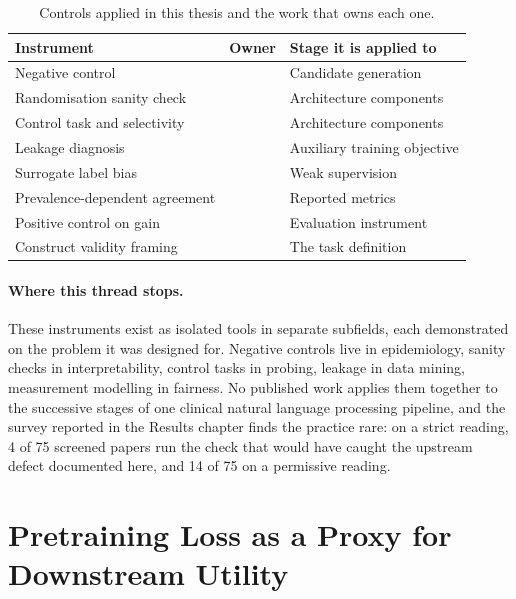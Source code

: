 \begin{table}[H]
\caption{Controls applied in this thesis and the work that owns each one.}
\label{tab:lit-controls}
\centering
\begin{tabular}{lll}
\toprule
Instrument & Owner & Stage it is applied to \\
\midrule
Negative control & \citet{lipsitch2010negative} & Candidate generation \\
Randomisation sanity check & \citet{adebayo2018sanity} & Architecture components \\
Control task and selectivity & \citet{hewitt2019control} & Architecture components \\
Leakage diagnosis & \citet{kaufman2012leakage} & Auxiliary training objective \\
Surrogate label bias & \citet{egami2023surrogates} & Weak supervision \\
Prevalence-dependent agreement & \citet{feinstein1990paradoxes} & Reported metrics \\
Positive control on gain & \citet{lourie2025scaling} & Evaluation instrument \\
Construct validity framing & \citet{jacobs2021measurement} & The task definition \\
\bottomrule
\end{tabular}
\end{table}

\paragraph{Where this thread stops.} These instruments exist as isolated tools in separate
subfields, each demonstrated on the problem it was designed for. Negative controls live in
epidemiology, sanity checks in interpretability, control tasks in probing, leakage in data
mining, measurement modelling in fairness. No published work applies them together to the
successive stages of one clinical natural language processing pipeline, and the survey
reported in the Results chapter finds the practice rare: on a strict reading, 4 of 75
screened papers run the check that would have caught the upstream defect documented here, and
14 of 75 on a permissive reading.

\section{Pretraining Loss as a Proxy for Downstream Utility}
\label{sec:lit-loss}

